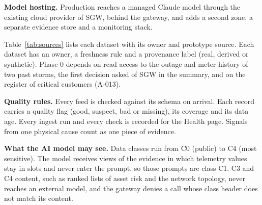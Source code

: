 \documentclass[fontsize=10pt,a4paper,DIV=12,parskip=half-,numbers=noenddot,headsepline,captions=tableheading]{scrartcl}
\begin{document}
\textbf{Model hosting.} Production reaches a managed Claude model through the existing cloud provider of SGW, behind the gateway, and adds a second zone, a separate evidence store and a monitoring stack.

Table~\ref{tab:sources} lists each dataset with its owner and prototype source. Each dataset has an owner, a freshness rule and a provenance label (real, derived or synthetic). Phase 0 depends on read access to the outage and meter history of two past storms, the first decision asked of SGW in the summary, and on the register of critical customers (A-013).

\textbf{Quality rules.} Every feed is checked against its schema on arrival. Each record carries a quality flag (good, suspect, bad or missing), its coverage and its data age. Every ingest run and every check is recorded for the Health page. Signals from one physical cause count as one piece of evidence.

\textbf{What the AI model may see.} Data classes run from C0 (public) to C4 (most sensitive). The model receives views of the evidence in which telemetry values stay in slots and never enter the prompt, so those prompts are class C1. C3 and C4 content, such as ranked lists of asset risk and the network topology, never reaches an external model, and the gateway denies a call whose class header does not match its content.
\end{document}

